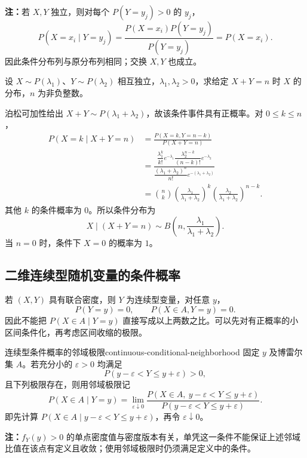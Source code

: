 \textbf{注：}\quad 若 $X,Y$ 独立，则对每个 $P(Y=y_j)>0$ 的 $y_j$，
\[
P(X=x_i\mid Y=y_j)
=\frac{P(X=x_i)P(Y=y_j)}{P(Y=y_j)}=P(X=x_i).
\]
因此条件分布列与原分布列相同；交换 $X,Y$ 也成立。

\begin{example}[给定独立泊松变量的和]
设 $X\sim P(\lambda_1)$、$Y\sim P(\lambda_2)$ 相互独立，$\lambda_1,\lambda_2>0$，求给定 $X+Y=n$ 时 $X$ 的分布，$n$ 为非负整数。

泊松可加性给出 $X+Y\sim P(\lambda_1+\lambda_2)$，故该条件事件具有正概率。对 $0\leq k\leq n$，
\begin{align*}
P(X=k\mid X+Y=n)
&=\frac{P(X=k,Y=n-k)}{P(X+Y=n)}\\
&=\frac{\dfrac{\lambda_1^k}{k!}e^{-\lambda_1}
 \dfrac{\lambda_2^{n-k}}{(n-k)!}e^{-\lambda_2}}
 {\dfrac{(\lambda_1+\lambda_2)^n}{n!}e^{-(\lambda_1+\lambda_2)}}\\
&=\binom nk\left(\frac{\lambda_1}{\lambda_1+\lambda_2}\right)^k
 \left(\frac{\lambda_2}{\lambda_1+\lambda_2}\right)^{n-k}.
\end{align*}
其他 $k$ 的条件概率为 $0$。所以条件分布为
\[
X\mid(X+Y=n)\sim B\left(n,\frac{\lambda_1}{\lambda_1+\lambda_2}\right).
\]
当 $n=0$ 时，条件下 $X=0$ 的概率为 $1$。
\end{example}

\subsection*{二维连续型随机变量的条件概率}

若 $(X,Y)$ 具有联合密度，则 $Y$ 为连续型变量，对任意 $y$，
\[
P(Y=y)=0,\qquad P(X\in A,Y=y)=0.
\]
因此不能把 $P(X\in A\mid Y=y)$ 直接写成以上两数之比。可以先对有正概率的小区间条件化，再考虑区间收缩的极限。

\begin{mydefinition}{连续型条件概率的邻域极限}{continuous-conditional-neighborhood}
固定 $y$ 及博雷尔集 $A$。若充分小的 $\varepsilon>0$ 均满足
\[
P(y-\varepsilon<Y\leq y+\varepsilon)>0,
\]
且下列极限存在，则用邻域极限记
\[
P(X\in A\mid Y=y)
=\lim_{\varepsilon\downarrow0}
\frac{P(X\in A,\ y-\varepsilon<Y\leq y+\varepsilon)}
 {P(y-\varepsilon<Y\leq y+\varepsilon)}.
\]
即先计算 $P(X\in A\mid y-\varepsilon<Y\leq y+\varepsilon)$，再令 $\varepsilon\downarrow0$。
\end{mydefinition}

\textbf{注：}\quad $f_Y(y)>0$ 的单点密度值与密度版本有关，单凭这一条件不能保证上述邻域比值在该点有定义且收敛；使用邻域极限时仍须满足定义中的条件。


